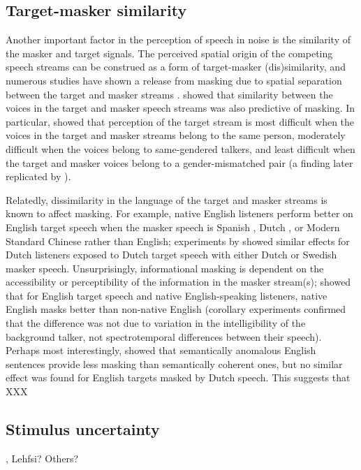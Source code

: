 \subsection{Target-masker similarity}
Another important factor in the perception of speech in noise is the similarity of the masker and target signals.  The perceived spatial origin of the competing speech streams can be construed as a form of target-masker (dis)similarity, and numerous studies have shown a release from masking due to spatial separation between the target and masker streams \citep[e.g.,][]{BrungartSimpson2002, FreymanEtAl1999, FreymanEtAl2004, KiddEtAl2005a, JohnstoneLitovsky2006}.  \citet{Brungart2001} showed that similarity between the voices in the target and masker speech streams was also predictive of masking.  In particular, \citeauthor{Brungart2001} showed that perception of the target stream is most difficult when the voices in the target and masker streams belong to the same person, moderately difficult when the voices belong to same-gendered talkers, and least difficult when the target and masker voices belong to a gender-mismatched pair (a finding later replicated by \citealt{HelferFreyman2008}).  

Relatedly, dissimilarity in the language of the target and masker streams is known to affect masking.  For example, native English listeners perform better on English target speech when the masker speech is Spanish \citep{GarciaLecumberriCooke2006}, Dutch \citep{BrouwerEtAl2012}, or Modern Standard Chinese \citep{VanEngenBradlow2007} rather than English; experiments by \citet{RhebergenEtAl2005} showed similar effects for Dutch listeners exposed to Dutch target speech with either Dutch or Swedish masker speech.  Unsurprisingly, informational masking is dependent on the accessibility or perceptibility of the information in the masker stream(s); \citet{CalandruccioEtAl2010} showed that for English target speech and native English-speaking listeners, native English masks better than non-native English (corollary experiments confirmed that the difference was not due to variation in the intelligibility of the background talker, not spectrotemporal differences between their speech).  Perhaps most interestingly, \citet{BrouwerEtAl2012} showed that semantically anomalous English sentences provide less masking than semantically coherent ones, but no similar effect was found for English targets masked by Dutch speech.  This suggests that XXX 

\subsection{Stimulus uncertainty}
\citep{Watson2005}, Lehfsi?  Others?


